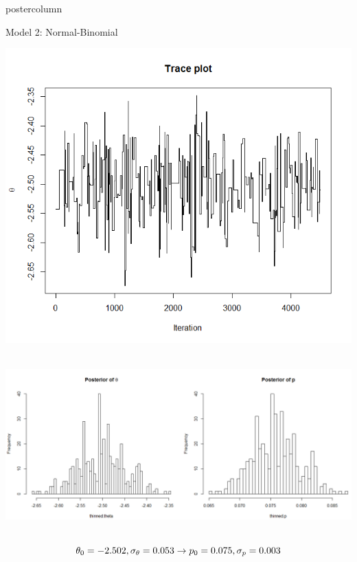 \documentclass[final]{beamer}\usepackage[]{graphicx}\usepackage[]{color}
\begin{document}
{\begin{frame}
\begin{columns}
\begin{column}{.33\textwidth}
\begin{beamercolorbox}[center,wd=\textwidth]{postercolumn}
\begin{minipage}[T]{.97\textwidth}
{\begin{block}{Model 2: Normal-Binomial}
\begin{minipage}[T]{.97\textwidth}
\vspace{.25cm}

\centering
\includegraphics[scale=1]{trace.png}\ \

\vspace{.15cm}

\centering
\includegraphics[scale=1.35]{posteriors.png}\ \

\vspace{-.25cm}

$$\boldmath{\theta_0=-2.502,\sigma_{\theta}=0.053\rightarrow p_0=0.075, \sigma_{p}=0.003}$$

\vspace{-.25cm}

\end{minipage}

\end{block}
\vfill

}
\end{minipage}
\end{beamercolorbox}
\end{column}
\end{columns}
\end{frame}}
\end{document}
